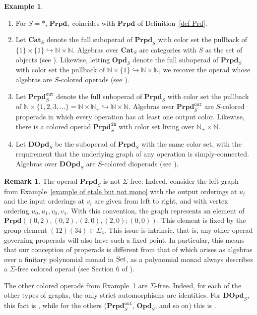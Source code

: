 \documentclass{amsart}
\numberwithin{theorem}{subsection}
\theoremstyle{definition}
\newtheorem{example}[theorem]{Example}
\newtheorem{remark}[theorem]{Remark}
\newcommand{\name}[1]{\ensuremath{\text{\textup{#1}}}}
\newcommand{\Set}{\name{Set}}
\newcommand{\out}{\mathtt{out}}
\newcommand{\inp}{\mathtt{in}}
\newcommand{\bfproperad}{\mathbf{Prpd}}
\begin{document}
\begin{example}\label{examples colored operads}
\leavevmode
	\begin{enumerate}
		\item For $S=*$, $\bfproperad_*$ coincides with $\bfproperad$ of Definition~\ref{def Prd}.
		\item Let $\mathbf{Cat}_S$ denote the full suboperad of $\bfproperad_S$ with color set the pullback of $ \{1\} \times \{1 \} \hookrightarrow \mathbb{N} \times \mathbb{N}$.
		Algebras over $\mathbf{Cat}_S$ are categories with $S$ as the set of objects (see \cite[2.1]{enriched}). Likewise, letting $\mathbf{Opd}_S$ denote the full suboperad of $\bfproperad_S$ with color set the pullback of $\mathbb{N}\times \{1 \} \hookrightarrow \mathbb{N} \times \mathbb{N}$, we recover the operad whose algebras are $S$-colored operads (see \cite[Definition 5.1.5]{ChuHaugseng}).
		\item Let $\bfproperad^{\out}_S$ denote the full suboperad of $\bfproperad_S$ with color set the pullback of $\mathbb{N} \times \{1, 2, 3, \dots \} = \mathbb{N} \times \mathbb{N}_+ \hookrightarrow \mathbb{N} \times \mathbb{N}$.
		Algebras over $\bfproperad^{\out}_S$ are $S$-colored properads in which every operation has at least one output color. Likewise, there is a colored operad $\bfproperad^{\inp}_S$ with color set living over $\mathbb{N}_+ \times \mathbb{N}$.
		\item Let $\mathbf{DOpd}_S$ be the suboperad of $\bfproperad_S$ with the same color set, with the requirement that the underlying graph of any operation is simply-connected.
		Algebras over $\mathbf{DOpd}_S$ are $S$-colored dioperads (see \cite[\S 11.5]{YauJohnson:FPAM}).
	\end{enumerate}
\end{example}

\begin{remark}\label{remark not sigma free}
The operad $\bfproperad_S$ is not $\Sigma$-free.
Indeed, consider the left graph from Example~\ref{example of etale but not mono} with the output orderings at $u_i$ and the input orderings at $v_i$ are given from left to right, and with vertex ordering $u_0, u_1, v_0, v_1$.
With this convention, the graph represents an element of $\bfproperad((0,2),(0,2),(2,0),(2,0); (0,0))$.
This element is fixed by the group element $(12)(34) \in \Sigma_4$.
This issue is intrinsic, that is, any other operad governing properads will also have such a fixed point.
In particular, this means that our conception of properads is different from that of \cite[10.4]{batanin-berger} which arises as algebras over a finitary polynomial monad in $\Set$, as a polynomial monad always describes a $\Sigma$-free colored operad (see Section 6 of \cite{batanin-berger}).

The other colored operads from Example~\ref{examples colored operads} are $\Sigma$-free.
Indeed, for each of the other types of graphs, the only strict automorphisms are identities.
For $\mathbf{DOpd}_S$, this fact is \cite[Proposition 4.14]{YauJohnson:FPAM}, while for the others ($\bfproperad^{\out}_S$, $\mathbf{Opd}_S$, and so on) this is \cite[Lemma 4.8]{YauJohnson:FPAM}.
\end{remark}
\end{document}
